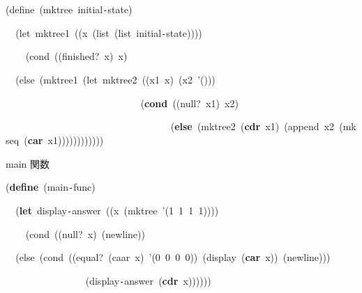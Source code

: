 \documentclass[a4paper,10pt]{article}
\def\mc{\relax}
\begin{document}
\noindent
\mbox{}(define{\tt\mc \ }(mktree{\tt\mc \ }initial{\tt -}state)

\noindent
\mbox{}{\tt\mc \ }{\tt\mc \ }(let{\tt\mc \ }mktree1{\tt\mc \ }((x{\tt\mc \ }(list{\tt\mc \ }(list{\tt\mc \ }initial{\tt -}state))))

\noindent
\mbox{}{\tt\mc \ }{\tt\mc \ }{\tt\mc \ }{\tt\mc \ }(cond{\tt\mc \ }((finished?{\tt\mc \ }x){\tt\mc \ }x)

\noindent
\mbox{}{\tt\mc \ }{\tt\mc \ }(else{\tt\mc \ }(mktree1{\tt\mc \ }(let{\tt\mc \ }mktree2{\tt\mc \ }((x1{\tt\mc \ }x){\tt\mc \ }(x2{\tt\mc \ }'()))

\noindent
\mbox{}{\tt\mc \ }{\tt\mc \ }{\tt\mc \ }{\tt\mc \ }{\tt\mc \ }{\tt\mc \ }{\tt\mc \ }{\tt\mc \ }{\tt\mc \ }{\tt\mc \ }{\tt\mc \ }{\tt\mc \ }{\tt\mc \ }{\tt\mc \ }{\tt\mc \ }{\tt\mc \ }{\tt\mc \ }{\tt\mc \ }{\tt\mc \ }{\tt\mc \ }{\tt\mc \ }{\tt\mc \ }{\tt\mc \ }{\tt\mc \ }{\tt\mc \ }{\tt\mc \ }{\tt\mc \ }(\textbf{cond}{\tt\mc \ }((null?{\tt\mc \ }x1){\tt\mc \ }x2)

\noindent
\mbox{}{\tt\mc \ }{\tt\mc \ }{\tt\mc \ }{\tt\mc \ }{\tt\mc \ }{\tt\mc \ }{\tt\mc \ }{\tt\mc \ }{\tt\mc \ }{\tt\mc \ }{\tt\mc \ }{\tt\mc \ }{\tt\mc \ }{\tt\mc \ }{\tt\mc \ }{\tt\mc \ }{\tt\mc \ }{\tt\mc \ }{\tt\mc \ }{\tt\mc \ }{\tt\mc \ }{\tt\mc \ }{\tt\mc \ }{\tt\mc \ }{\tt\mc \ }{\tt\mc \ }{\tt\mc \ }{\tt\mc \ }{\tt\mc \ }{\tt\mc \ }{\tt\mc \ }{\tt\mc \ }{\tt\mc \ }(\textbf{else}{\tt\mc \ }(mktree2{\tt\mc \ }(\textbf{cdr}{\tt\mc \ }x1){\tt\mc \ }(append{\tt\mc \ }x2{\tt\mc \ }(mkseq{\tt\mc \ }(\textbf{car}{\tt\mc \ }x1))))))))))))

\noindent
\mbox{}\hfill

\noindent
\mbox{}\rm\mc {\tt ;}  main 関数
\tt\mc 

\noindent
\mbox{}(\textbf{define}{\tt\mc \ }(main{\tt -}func)

\noindent
\mbox{}{\tt\mc \ }{\tt\mc \ }(\textbf{let}{\tt\mc \ }display{\tt -}answer{\tt\mc \ }((x{\tt\mc \ }(mktree{\tt\mc \ }'(1{\tt\mc \ }1{\tt\mc \ }1{\tt\mc \ }1))))

\noindent
\mbox{}{\tt\mc \ }{\tt\mc \ }{\tt\mc \ }{\tt\mc \ }(cond{\tt\mc \ }((null?{\tt\mc \ }x){\tt\mc \ }(newline))

\noindent
\mbox{}{\tt\mc \ }{\tt\mc \ }(else{\tt\mc \ }(cond{\tt\mc \ }((equal?{\tt\mc \ }(caar{\tt\mc \ }x){\tt\mc \ }'(0{\tt\mc \ }0{\tt\mc \ }0{\tt\mc \ }0)){\tt\mc \ }(display{\tt\mc \ }(\textbf{car}{\tt\mc \ }x)){\tt\mc \ }(newline)))

\noindent
\mbox{}{\tt\mc \ }{\tt\mc \ }{\tt\mc \ }{\tt\mc \ }{\tt\mc \ }{\tt\mc \ }{\tt\mc \ }{\tt\mc \ }{\tt\mc \ }{\tt\mc \ }{\tt\mc \ }{\tt\mc \ }{\tt\mc \ }{\tt\mc \ }{\tt\mc \ }{\tt\mc \ }(display{\tt -}answer{\tt\mc \ }(\textbf{cdr}{\tt\mc \ }x))))))

\rm\mc
\end{document}

